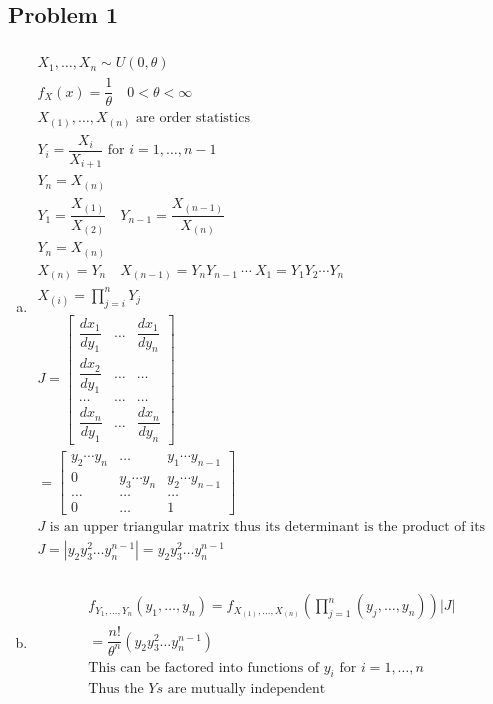 \documentclass{article}
\begin{document}
\begin{flushleft}

	\section*{Problem 1}
	
\begin{enumerate}[(a)]
	
	\item 
\begin{multline*}\\
X_1,\dots,X_n \sim U(0,\theta)\\
f_X(x)=\dfrac{1}{\theta} \quad 0<\theta<\infty\\
X_{(1)},\dots, X_{(n)} \text{ are order statistics}\\
Y_i=\dfrac{X_{i}}{X_{i+1}} \text{ for } i=1,\dots,n-1\\ Y_n=X_{(n)}\\
Y_{1}=\dfrac{X_{(1)}}{X_{(2)}} \quad Y_{n-1}=\dfrac{X_{(n-1)}}{X_{(n)}}\\
Y_n=X_{(n)}\\
X_{(n)}=Y_n \quad X_{(n-1)}=Y_n Y_{n-1} \ \cdots \ X_1=Y_1Y_2\cdots Y_n\\
X_{(i)}=\prod_{j=i}^{n}Y_j\\
J=\begin{bmatrix}
\dfrac{dx_1}{dy_1} & \dots & \dfrac{dx_1}{dy_n}\\
\dfrac{dx_2}{dy_1} &\dots &\dots\\
\dots &\dots &\dots\\
\dfrac{dx_n}{dy_1} & \dots & \dfrac{dx_n}{dy_n}
\end{bmatrix}\\
=\begin{bmatrix}
y_2\cdots y_n & \dots & y_1\cdots y_{n-1}\\
0 & y_3\cdots y_n & y_2\cdots y_{n-1}\\
\dots & \dots & \dots\\
0 & \dots & 1
\end{bmatrix}\\
J \text{ is an upper triangular matrix thus its determinant is the product of its main diagonal}\\
J=|y_2 y_3^2 \dots y_n^{n-1}|=y_2 y_3^2 \dots y_n^{n-1}\\
\end{multline*}

	\item 
\begin{multline*}\\
f_{Y_1,\dots,Y_n}(y_1,\dots,y_n)=f_{X_{(1)},\dots,X_{(n)}}(\prod_{j=1}^{n}(y_j,\dots,y_n))|J|\\
=\dfrac{n!}{\theta^n}(y_2 y_3^2 \dots y_n^{n-1})\\
\text{This can be factored into functions of } y_i \text{ for } i=1,\dots,n\\
\text{Thus the } Ys \text{ are mutually independent}\\
\end{multline*}


\end{enumerate}
\end{flushleft}
\end{document}
